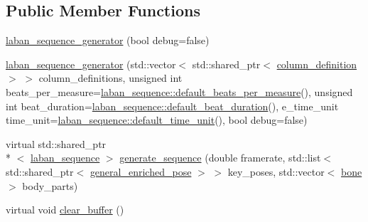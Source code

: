 \subsection*{Public Member Functions}
\begin{DoxyCompactItemize}
\item 
\hyperlink{classmae_1_1fl_1_1laban_1_1laban__sequence__generator_a0a792b68242d577bf3a8a627aeeaf43d}{laban\-\_\-sequence\-\_\-generator} (bool debug=false)
\item 
\hyperlink{classmae_1_1fl_1_1laban_1_1laban__sequence__generator_a69a1595e54b58f0051bc9ac8e4c99f82}{laban\-\_\-sequence\-\_\-generator} (std\-::vector$<$ std\-::shared\-\_\-ptr$<$ \hyperlink{classmae_1_1fl_1_1laban_1_1column__definition}{column\-\_\-definition} $>$ $>$ column\-\_\-definitions, unsigned int beats\-\_\-per\-\_\-measure=\hyperlink{classmae_1_1fl_1_1laban_1_1laban__sequence_a2e64362d5cfeb89eb8545cb064e63170}{laban\-\_\-sequence\-::default\-\_\-beats\-\_\-per\-\_\-measure}(), unsigned int beat\-\_\-duration=\hyperlink{classmae_1_1fl_1_1laban_1_1laban__sequence_ac7bf04cdac0c3aed6b8ee4a887e561d9}{laban\-\_\-sequence\-::default\-\_\-beat\-\_\-duration}(), e\-\_\-time\-\_\-unit time\-\_\-unit=\hyperlink{classmae_1_1fl_1_1laban_1_1laban__sequence_ada28215d43d85e983fe6129e9816eed2}{laban\-\_\-sequence\-::default\-\_\-time\-\_\-unit}(), bool debug=false)
\item 
virtual std\-::shared\-\_\-ptr\\*
$<$ \hyperlink{classmae_1_1fl_1_1laban_1_1laban__sequence}{laban\-\_\-sequence} $>$ \hyperlink{classmae_1_1fl_1_1laban_1_1laban__sequence__generator_a6311b99a7bf78c2d9779d601ad88353e}{generate\-\_\-sequence} (double framerate, std\-::list$<$ std\-::shared\-\_\-ptr$<$ \hyperlink{classmae_1_1general__enriched__pose}{general\-\_\-enriched\-\_\-pose} $>$ $>$ key\-\_\-poses, std\-::vector$<$ \hyperlink{classmae_1_1bone}{bone} $>$ body\-\_\-parts)
\item 
virtual void \hyperlink{classmae_1_1fl_1_1laban_1_1laban__sequence__generator_a6916b1796631900891e63ddbc1b7d62a}{clear\-\_\-buffer} ()
\end{DoxyCompactItemize}


